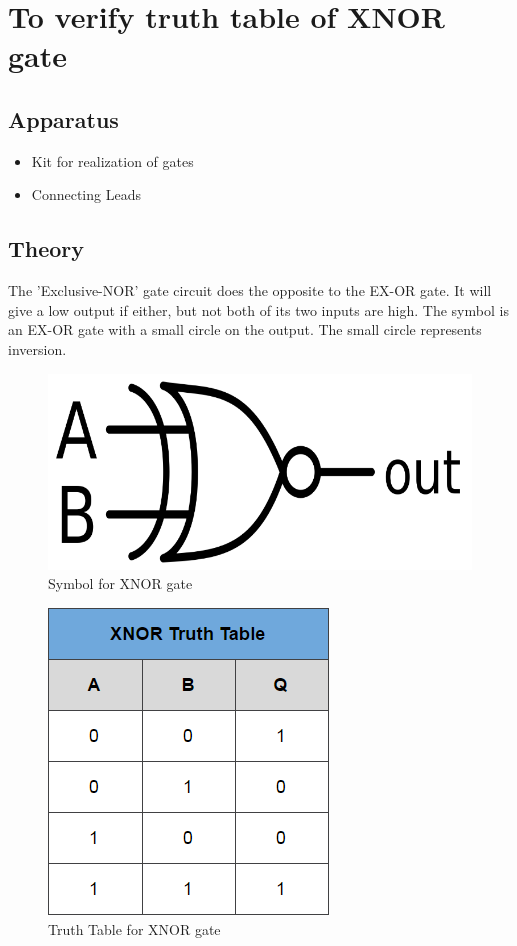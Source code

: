 \chapter{To verify truth table of XNOR gate}

\section{Apparatus}
	\begin{itemize}
		\tightlist
		\item Kit for realization of gates
		\item Connecting Leads
	\end{itemize}

\section{Theory}
	The 'Exclusive-NOR' gate circuit does the opposite to the EX-OR gate. It will give a low output if either, but not both of its two inputs are high. The symbol is an EX-OR gate with a small circle on the output. The small circle represents inversion.
	\begin{figure}[h]
		\centering
		\includegraphics{img/exp7/1}
		\caption{Symbol for XNOR gate}
		\label{fig:7:1}
	\end{figure}
	\begin{figure}[h]
		\centering
		\includegraphics{img/exp7/2}
		\caption{Truth Table for XNOR gate}
		\label{fig:7:2}
	\end{figure}
	
